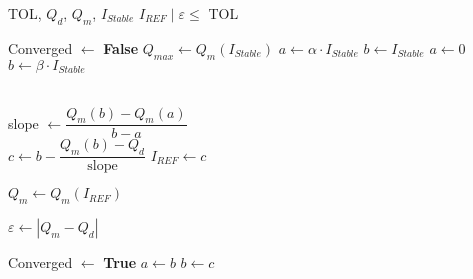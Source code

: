 \begin{algorithmic}[1]

\Require TOL, $Q_{d}$, $Q_{m}$, $I_{Stable}$
\Ensure $I_{REF} \; | \; \varepsilon \leq$ TOL

\State Converged $\gets$ \textbf{False}
\State $Q_{max} \gets Q_m(I_{Stable})$
 
    \State $a \gets \alpha \cdot I_{Stable}$
    \State $b \gets I_{Stable}$
    \Else {}
        \State $a \gets 0$
        \State $b \gets \beta \cdot I_{Stable}$
\EndIf


  \\
    \State slope $ \gets \dfrac{Q_m(b) - Q_m(a)}{b-a}$
     \\
    \State $c \gets b - \dfrac{Q_m(b) - Q_d}{\text{slope}}$
    \State $I_{REF} \gets c$

    \State $Q_{m} \gets Q_{m}\left(I_{REF}\right)$  

    \State $\varepsilon \gets \left|Q_m - Q_d \right|$

     Converged $\gets$ \textbf{True} 
        \Else
            \State $a \gets b$
            \State $b \gets c$
    \EndIf

\EndWhile
\end{algorithmic}